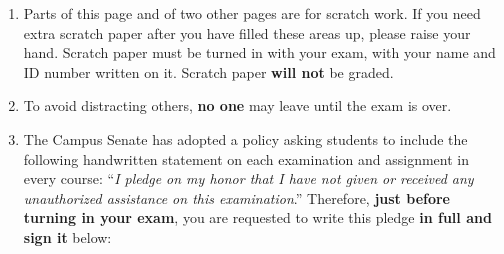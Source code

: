 \documentclass[11pt]{article}
\begin{document}
\begin{enumerate}
    \item Parts of this page and of two other pages are
          for scratch work.  If you need extra scratch paper
          after you have filled
          these areas
          up, please raise your hand.
          Scratch paper must be turned in with your exam, with your name and
          ID number written on it.
          Scratch paper \textbf{will not} be graded.

    \item To avoid distracting others, {\bf no one} may leave until the exam
          is over.

    \item The Campus Senate has adopted a policy asking students to include
          the following handwritten statement on each examination and
          assignment in every course: ``\textit{I pledge on my honor that I
          have not given or received any unauthorized assistance on this
          examination\/}.''  Therefore, \textbf{just before turning in your
          exam}, you are requested to write this pledge \textbf{in full
          \textmd{and} sign it} below:

          \medskip

          \begin{minipage}[t]{6.6in}

            \addtolength{\baselineskip}{4mm}

            \underline{\hspace{6.6in}}

            \underline{\hspace{6.6in}}

          \end{minipage}

    \medskip

  \end{enumerate}
\end{document}
